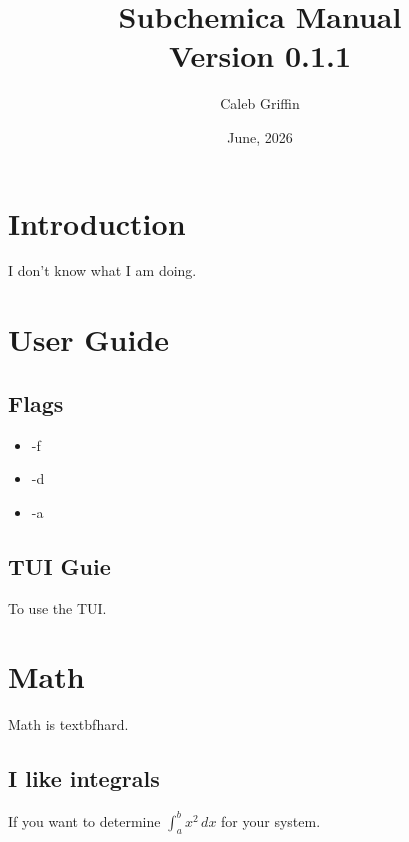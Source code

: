 \documentclass[12pt, letterpaper]{article}
\title{Subchemica Manual\\[0.12in] \large Version 0.1.1}
\author{Caleb Griffin}
\date{June, 2026}
\begin{document}
\maketitle
\thispagestyle{empty}

\pagebreak
\tableofcontents
\pagebreak

\section{Introduction}
I don't know what I am doing.

\section{User Guide}

\subsection{Flags}
\begin{itemize}
\item -f
\item -d
\item -a
\end{itemize}

\subsection{TUI Guie}
To use the TUI.

\section{Math}
Math is textbf{hard}.

\subsection{I like integrals}
If you want to determine \(\int_a^b x^2\,dx\) for your system.
\end{document}
